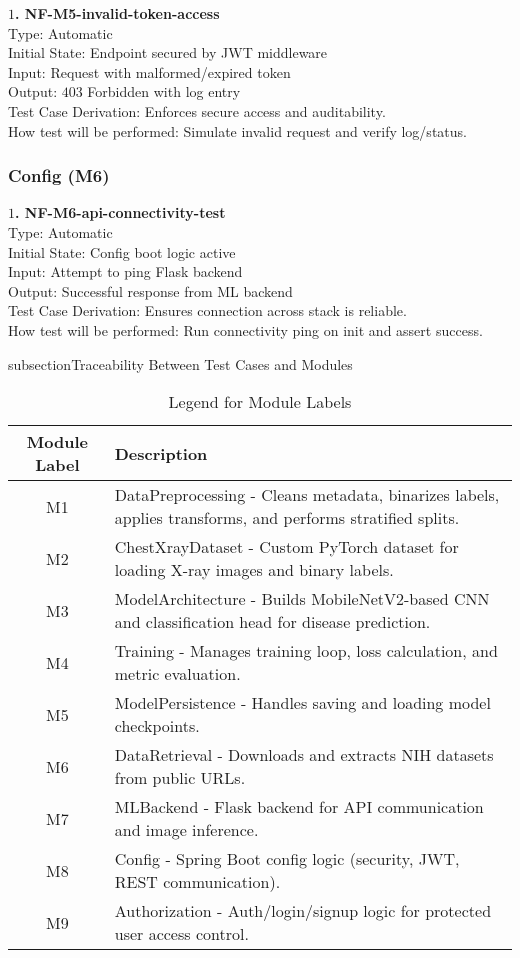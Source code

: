 \documentclass[12pt, titlepage]{article}
\begin{document}
\textbf{$1$. NF-M5-invalid-token-access}\\
Type: Automatic\\
Initial State: Endpoint secured by JWT middleware\\
Input: Request with malformed/expired token\\
Output: $403$ Forbidden with log entry\\
Test Case Derivation: Enforces secure access and auditability.\\
How test will be performed: Simulate invalid request and verify log/status.

\subsubsection{Config (M6)}

\textbf{$1$. NF-M6-api-connectivity-test}\\
Type: Automatic\\
Initial State: Config boot logic active\\
Input: Attempt to ping Flask backend\\
Output: Successful response from ML backend\\
Test Case Derivation: Ensures connection across stack is reliable.\\
How test will be performed: Run connectivity ping on init and assert success.




subsection{Traceability Between Test Cases and Modules}

\begin{table}[h!]
  \centering
  \caption{Legend for Module Labels}
  \begin{tabular}{|c|p{}|}
    \hline
    \textbf{Module Label} & \textbf{Description} \\
    \hline
    M1 & DataPreprocessing - Cleans metadata, binarizes labels, applies transforms, and performs stratified splits. \\
    \hline
    M2 & ChestXrayDataset - Custom PyTorch dataset for loading X-ray images and binary labels. \\
    \hline
    M3 & ModelArchitecture - Builds MobileNetV2-based CNN and classification head for disease prediction. \\
    \hline
    M4 & Training - Manages training loop, loss calculation, and metric evaluation. \\
    \hline
    M5 & ModelPersistence - Handles saving and loading model checkpoints. \\
    \hline
    M6 & DataRetrieval - Downloads and extracts NIH datasets from public URLs. \\
    \hline
    M7 & MLBackend - Flask backend for API communication and image inference. \\
    \hline
    M8 & Config - Spring Boot config logic (security, JWT, REST communication). \\
    \hline
    M9 & Authorization - Auth/login/signup logic for protected user access control. \\
    \hline
  \end{tabular}
\end{table}
\end{document}
